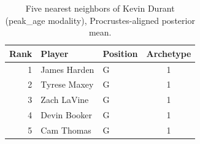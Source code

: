 \begin{table}[htbp]
  \centering\small
  \begin{tabular}{rllc}
    \toprule
    Rank & Player & Position & Archetype \\
    \midrule
    1 & James Harden & G & 1 \\
    2 & Tyrese Maxey & G & 1 \\
    3 & Zach LaVine & G & 1 \\
    4 & Devin Booker & G & 1 \\
    5 & Cam Thomas & G & 1 \\
    \bottomrule
  \end{tabular}
  \caption{Five nearest neighbors of Kevin Durant (peak_age modality), Procrustes-aligned posterior mean.}
  \label{tab:Kevin_Durant_neighbors_peak_age}
\end{table}

